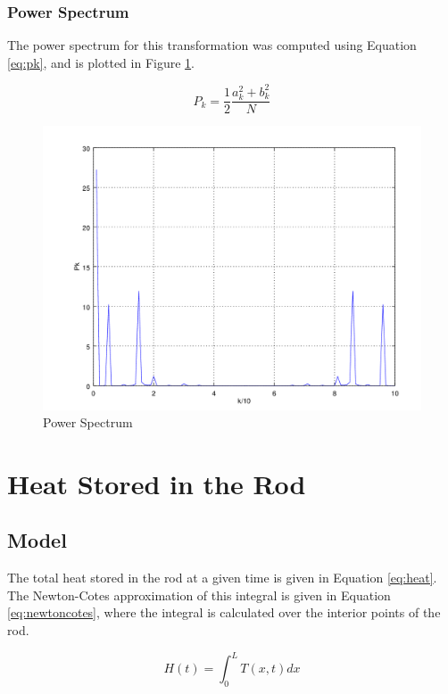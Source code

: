 \documentclass[12pt]{amsart}
\begin{document}
\subsubsection{Power Spectrum}

The power spectrum for this transformation was computed using Equation \ref{eq:pk}, and is plotted in Figure \ref{fig:powerspectrum}. 

\begin{equation}
P_k = \frac{1}{2} \frac{a_k^2 + b_k^2}{N}
\label{eq:pk}
\end{equation}

\begin{center}
\begin{figure}
\includegraphics[scale=0.7]{Pkplot}
\caption{Power Spectrum}
\label{fig:powerspectrum}
\end{figure}
\end{center}

\section{Heat Stored in the Rod}
\subsection{Model}
The total heat stored in the rod at a given time is given in Equation \ref{eq:heat}. The Newton-Cotes approximation of this integral is given in Equation \ref{eq:newtoncotes}, where the integral is calculated over the interior points of the rod. 

\begin{equation}
H(t) = \int_0^L T(x,t) dx
\label{eq:heat}
\end{equation}
\end{document}
